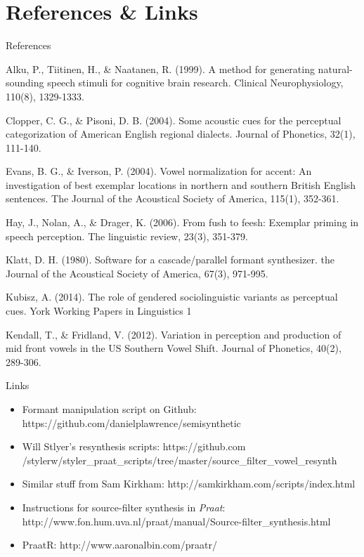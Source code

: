 \documentclass{beamer}
\begin{document}
\section{References \& Links}
\begin{frame}{References}
\begin{itemize}
\footnotesize{
\item{Alku, P., Tiitinen, H., \& Naatanen, R. (1999). A method for generating natural-sounding speech stimuli for cognitive brain research. Clinical Neurophysiology, 110(8), 1329-1333.}
\item{Clopper, C. G., \& Pisoni, D. B. (2004). Some acoustic cues for the perceptual categorization of American English regional dialects. Journal of Phonetics, 32(1), 111-140.}
\item{Evans, B. G., \& Iverson, P. (2004). Vowel normalization for accent: An investigation of best exemplar locations in northern and southern British English sentences. The Journal of the Acoustical Society of America, 115(1), 352-361.}
\item{Hay, J., Nolan, A., \& Drager, K. (2006). From fush to feesh: Exemplar priming in speech perception. The linguistic review, 23(3), 351-379.}
\item{Klatt, D. H. (1980). Software for a cascade/parallel formant synthesizer. the Journal of the Acoustical Society of America, 67(3), 971-995.}
\item{Kubisz, A. (2014). The role of gendered sociolinguistic variants as perceptual cues. York Working Papers in Linguistics 1}
\item{Kendall, T., \& Fridland, V. (2012). Variation in perception and production of mid front vowels in the US Southern Vowel Shift. Journal of Phonetics, 40(2), 289-306.}}
\end{itemize}
\end{frame}
\begin{frame}{Links}
\begin{itemize}
\footnotesize
\item{Formant manipulation script on Github: https://github.com/danielplawrence/semisynthetic}
\item{Will Stlyer's resynthesis scripts: https://github.com\\/stylerw/styler\_praat\_scripts/tree/master/source\_filter\_vowel\_resynth}
\item{Similar stuff from Sam Kirkham: http://samkirkham.com/scripts/index.html}
\item{Instructions for source-filter synthesis in \textit{Praat}: http://www.fon.hum.uva.nl/praat/manual/Source-filter\_synthesis.html}
\item{PraatR: http://www.aaronalbin.com/praatr/}
\end{itemize}
\end{frame}
\end{document}
